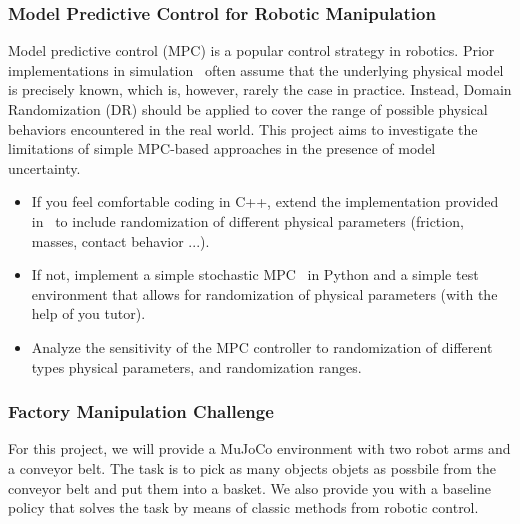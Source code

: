 \documentclass[a4paper]{article}
\begin{document}


\subsubsection{Model Predictive Control for Robotic Manipulation}

Model predictive control (MPC) is a popular control strategy in robotics. 
Prior implementations in simulation~\cite{MujocoMPC} often assume that the underlying physical model is precisely known, 
which is, however, rarely the case in practice. 
Instead, Domain Randomization (DR) should be applied to cover the range of possible physical behaviors encountered in the real world.
This project aims to investigate the limitations of simple MPC-based approaches in the presence of model uncertainty.

\begin{itemize}
  \item If you feel comfortable coding in C++, extend the implementation provided in~\cite{MujocoMPC} to include randomization of different physical parameters (friction, masses, contact behavior ...).
  \item If not, implement a simple stochastic MPC~\cite{Howell2022-uj} in Python and a simple test environment that allows for randomization of physical parameters (with the help of you tutor).
  \item Analyze the sensitivity of the MPC controller to randomization of different types physical parameters, and randomization ranges. 
\end{itemize} 

\subsubsection{Factory Manipulation Challenge}

For this project, we will provide a MuJoCo environment with two robot arms and a conveyor belt. 
The task is to pick as many objects objets as possbile from the conveyor belt and put them into a basket. 
We also provide you with a baseline policy that solves the task by means of classic methods from robotic control.
\end{document}
